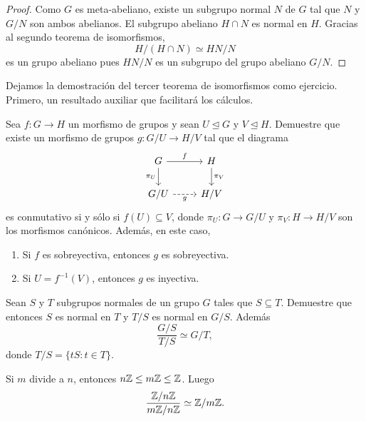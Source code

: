 \begin{proof}
Como $G$ es meta-abeliano, existe 
un subgrupo normal $N$ de $G$ tal que $N$ y $G/N$ son ambos abelianos. 
El subgrupo abeliano $H\cap N$ es normal en $H$. Gracias al segundo teorema de isomorfismos,
\[
H/(H\cap N)\simeq HN/N
\]
es un grupo abeliano pues $HN/N$ es un subgrupo del grupo abeliano $G/N$.   
\end{proof}

Dejamos la demostración del tercer teorema de isomorfismos como ejercicio. Primero, 
un resultado auxiliar que facilitará los cálculos. 

\begin{exercise}
	\label{xca:para_3er}
	Sea $f\colon G\to H$ un morfismo de grupos y sean $U\unlhd G$ y $V\unlhd H$. Demuestre que existe 
	un morfismo de grupos $g\colon G/U\to H/V$ tal que el diagrama
\[
\begin{tikzcd}
	G & H \\
	{G/U} & {H/V}
	\arrow["f", from=1-1, to=1-2]
	\arrow["{\pi_U}"', from=1-1, to=2-1]
	\arrow["g"', dashed, from=2-1, to=2-2]
	\arrow["{\pi_V}", from=1-2, to=2-2]
\end{tikzcd}
\]
	es conmutativo si y sólo si $f(U)\subseteq V$, donde $\pi_U\colon G\to G/U$ y $\pi_V\colon H\to H/V$ son los morfismos canónicos. Además, en este caso, 
	\begin{enumerate}
	\item Si $f$ es sobreyectiva, entonces $g$ es sobreyectiva.
	\item Si $U=f^{-1}(V)$, entonces $g$ es inyectiva. 	
	\end{enumerate}
\end{exercise}


\begin{exercise}
\label{xca:3er}
Sean $S$ y $T$ subgrupos normales de un grupo $G$ tales que $S\subseteq T$. Demuestre que 
entonces $S$ es normal en $T$ 
y $T/S$ es normal en $G/S$. Además
\[
\frac{G/S}{T/S}\simeq G/T,
\]
donde $T/S=\{tS:t\in T\}$.
\end{exercise}

\begin{example}
Si $m$ divide a $n$, entonces $n\mathbb{Z}\leq m\mathbb{Z}\leq\mathbb{Z}$. Luego
\[
\frac{\mathbb{Z}/n\mathbb{Z}}{m\mathbb{Z}/n\mathbb{Z}}\simeq\mathbb{Z}/m\mathbb{Z}.
\]	
\end{example}

